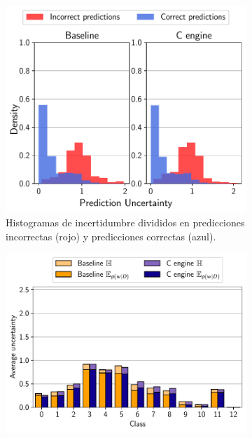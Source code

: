 \begin{figure}[h]
 	\centering
 	\begin{subfigure}[b]{0.48\textwidth}
     	\centering
     	\includegraphics[width=\textwidth]{root/Imagenes/bnn_lib/hist_predictions.pdf}
     	\caption{Histogramas de incertidumbre divididos en predicciones incorrectas (rojo) y predicciones correctas (azul).}
     	\label{fig:example_hist}
 	\end{subfigure}
 	\hfill
 	\begin{subfigure}[b]{0.48\textwidth}
     	\centering
     	\includegraphics[width=\textwidth]{root/Imagenes/bnn_lib/class_uncertainty.pdf}

\end{subfigure}
\end{figure}
